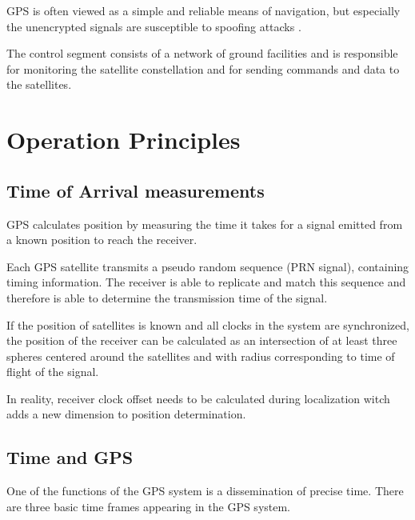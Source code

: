 GPS is often viewed as a simple and reliable means of navigation,
but especially the unencrypted signals are susceptible to spoofing attacks \cite{tippenhauer11}.


The control segment consists of a network of ground facilities and is responsible for
monitoring the satellite constellation and for sending commands and data to the satellites.



\section{Operation Principles}

\subsection{Time of Arrival measurements}

GPS calculates position by measuring the time it takes for a signal
emitted from a known position to reach the receiver.

Each GPS satellite transmits a pseudo random sequence (PRN signal),
containing timing information.
The receiver is able to replicate and match this sequence and therefore
is able to determine the transmission time of the signal.

If the position of satellites is known and all clocks in the system are
synchronized, the position of the receiver
can be calculated as an intersection of at least three spheres centered around the satellites
and with radius corresponding to time of flight of the signal.

In reality, receiver clock offset needs to be calculated
during localization witch adds a new dimension to position determination.

\subsection{Time and GPS}

One of the functions of the GPS system is a dissemination of precise time.
There are three basic time frames appearing in the GPS system.

